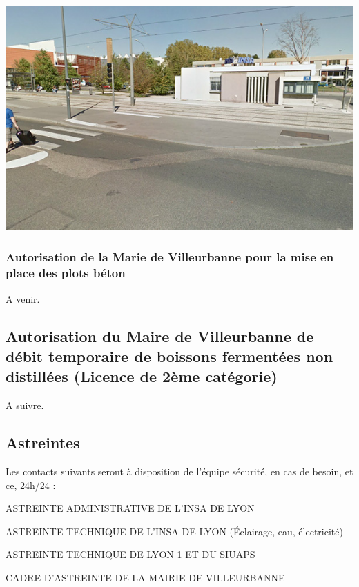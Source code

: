 \documentclass[hidelinks, paper=a4, fontsize=13pt]{report}
\begin{document}
\begin{center}
	\includegraphics[scale=0.7]{Annexes/Images/zoneARisque4}
\end{center}
\subsubsection{Autorisation de la Marie de Villeurbanne pour la mise en place des plots béton}
A venir.
	\label{refVentGS}

\subsection{Autorisation du Maire de Villeurbanne de débit temporaire de boissons fermentées non distillées (Licence de 2ème catégorie)}
A suivre.

\subsection{Astreintes}


Les contacts suivants seront à disposition de l’équipe sécurité, en cas de besoin, et ce, 24h/24 : 
\begin{list}{•}{}
	\item ASTREINTE ADMINISTRATIVE DE L’INSA DE LYON 
	\item ASTREINTE TECHNIQUE DE L’INSA DE LYON (Éclairage, eau, électricité)
	\item ASTREINTE TECHNIQUE DE LYON 1 ET DU SIUAPS
	\item CADRE D’ASTREINTE DE LA MAIRIE DE VILLEURBANNE
\end{list}
\end{document}
